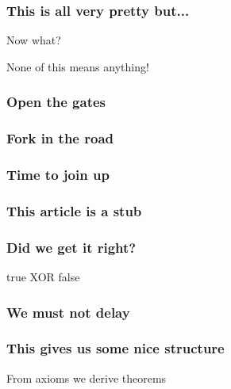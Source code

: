 \begin{frame}
    \frametitle{This is all very pretty but...}

    \centering

    \LARGE
    Now what?

    \pause

    None of this means anything!

\end{frame}
\begin{frame}
    \frametitle{Open the gates}

    \centering

\end{frame}
\begin{frame}
    \frametitle{Fork in the road}

    \centering

\end{frame}
\begin{frame}
    \frametitle{Time to join up}

    \centering

\end{frame}
\begin{frame}
    \frametitle{This article is a stub}

    \centering

\end{frame}
\begin{frame}
    \frametitle{Did we get it right?}

    \centering
    \LARGE
    true \alert{XOR} false

    \normalsize


\end{frame}
\begin{frame}
    \frametitle{We must not delay}

    \centering

\end{frame}
\begin{frame}
    \frametitle{This gives us some nice structure}

    \centering
    \LARGE

    \pause

    From \alert{axioms} we derive \alert{theorems}

    \pause
    \vspace{1em}


    \pause

    \vspace{1em}


\end{frame}
